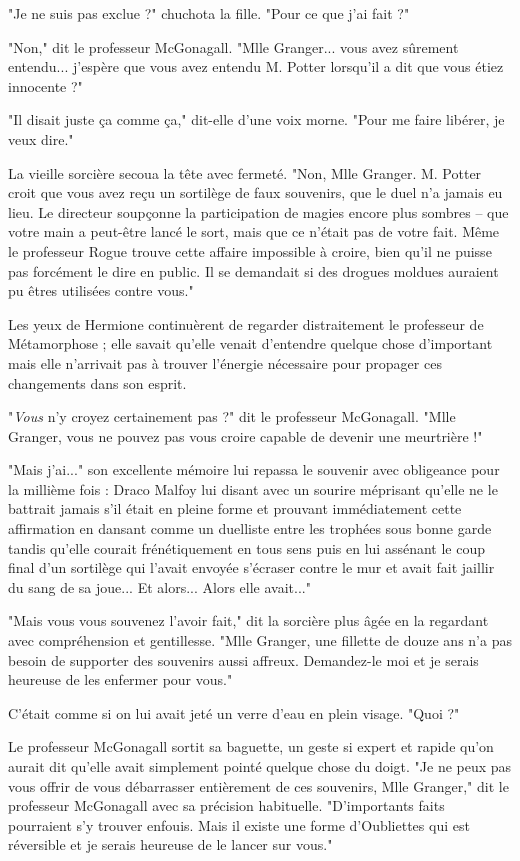 "Je ne suis pas exclue ?" chuchota la fille. "Pour ce que j'ai fait ?"

"Non," dit le professeur McGonagall. "Mlle Granger... vous avez sûrement entendu... j'espère que vous avez entendu M. Potter lorsqu'il a dit que vous étiez innocente ?"

"Il disait juste ça comme ça," dit-elle d'une voix morne. "Pour me faire libérer, je veux dire."

La vieille sorcière secoua la tête avec fermeté. "Non, Mlle Granger. M. Potter croit que vous avez reçu un sortilège de faux souvenirs, que le duel n'a jamais eu lieu. Le directeur soupçonne la participation de magies encore plus sombres – que votre main a peut-être lancé le sort, mais que ce n'était pas de votre fait. Même le professeur Rogue trouve cette affaire impossible à croire, bien qu'il ne puisse pas forcément le dire en public. Il se demandait si des drogues moldues auraient pu êtres utilisées contre vous."

Les yeux de Hermione continuèrent de regarder distraitement le professeur de Métamorphose ; elle savait qu'elle venait d'entendre quelque chose d'important mais elle n'arrivait pas à trouver l'énergie nécessaire pour propager ces changements dans son esprit.

"\emph{Vous}  n'y croyez certainement pas ?" dit le professeur McGonagall. "Mlle Granger, vous ne pouvez pas vous croire capable de devenir une meurtrière !"

"Mais j'ai..." son excellente mémoire lui repassa le souvenir avec obligeance pour la millième fois : Draco Malfoy lui disant avec un sourire méprisant qu'elle ne le battrait jamais s'il était en pleine forme et prouvant immédiatement cette affirmation en dansant comme un duelliste entre les trophées sous bonne garde tandis qu'elle courait frénétiquement en tous sens puis en lui assénant le coup final d'un sortilège qui l'avait envoyée s'écraser contre le mur et avait fait jaillir du sang de sa joue... Et alors... Alors elle avait..."

"Mais vous vous souvenez l'avoir fait," dit la sorcière plus âgée en la regardant avec compréhension et gentillesse. "Mlle Granger, une fillette de douze ans n'a pas besoin de supporter des souvenirs aussi affreux. Demandez-le moi et je serais heureuse de les enfermer pour vous."

C'était comme si on lui avait jeté un verre d'eau en plein visage. "Quoi ?"

Le professeur McGonagall sortit sa baguette, un geste si expert et rapide qu'on aurait dit qu'elle avait simplement pointé quelque chose du doigt. "Je ne peux pas vous offrir de vous débarrasser entièrement de ces souvenirs, Mlle Granger," dit le professeur McGonagall avec sa précision habituelle. "D'importants faits pourraient s'y trouver enfouis. Mais il existe une forme d'Oubliettes qui est réversible et je serais heureuse de le lancer sur vous."

